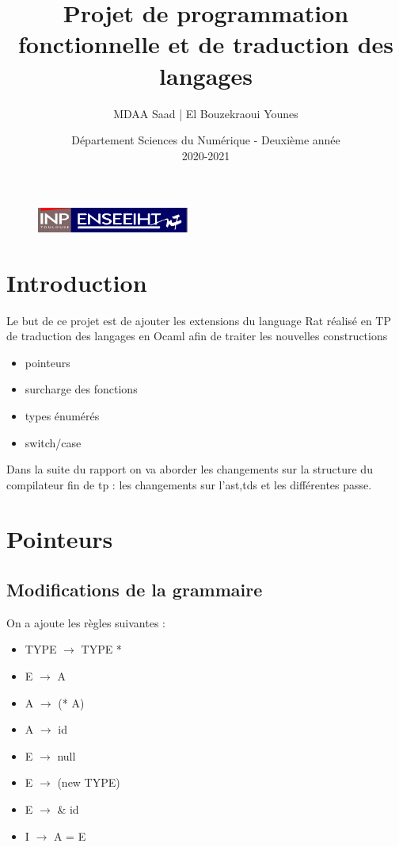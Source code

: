\documentclass{article}
\begin{document}
\begin{figure}[t]
\centering
\includegraphics[width=5cm]{inp_n7.png}
\end{figure}

\title{\vspace{4cm} \textbf{Projet de programmation fonctionnelle et de traduction des langages}}
\author{MDAA Saad | El Bouzekraoui Younes}
\date{\vspace{7cm} Département Sciences du Numérique - Deuxième année \\
2020-2021 }

\maketitle

\newpage
\tableofcontents

\newpage
\section{Introduction}
Le but de ce projet est de ajouter les extensions du language Rat  réalisé en TP de traduction des langages en Ocaml afin de traiter les nouvelles 
constructions 
\begin{itemize}
    \item pointeurs
    \item surcharge des fonctions
    \item types énumérés
    \item switch/case
\end{itemize}
Dans la suite du rapport on va aborder les changements sur la structure du compilateur fin de tp : les changements sur l'ast,tds et les différentes passe. 
\section{Pointeurs}
\subsection{Modifications de la grammaire}
On a ajoute les règles suivantes :
\begin{itemize}
    \item TYPE $\rightarrow$ TYPE *
    \item E $\rightarrow$ A
    \item A $\rightarrow$ (* A)
    \item A $\rightarrow$ id
    \item E $\rightarrow$ null
    \item E $\rightarrow$ (new TYPE)
    \item E $\rightarrow$ \& id
    \item I $\rightarrow$ A = E
\end{itemize}
\end{document}
